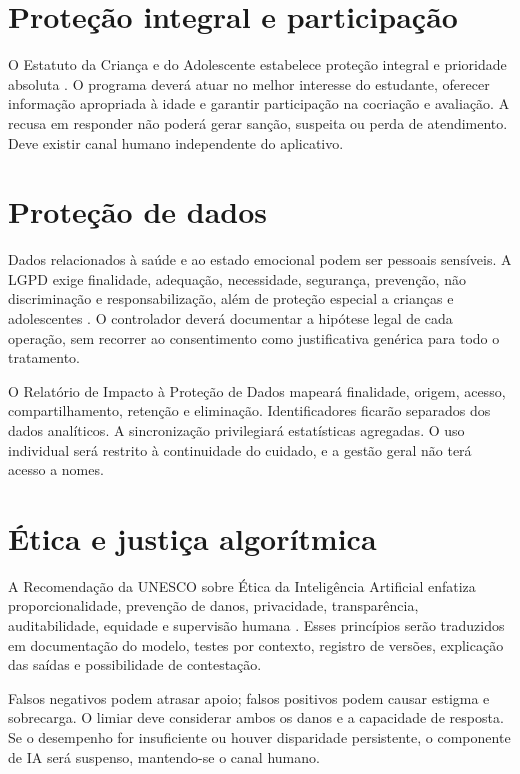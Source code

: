 \documentclass[
  12pt,
  openright,
  oneside,
  a4paper,
  english,
  brazil
]{abntex2}
\begin{document}
\section{Proteção integral e participação}

O Estatuto da Criança e do Adolescente estabelece proteção integral e prioridade
absoluta \cite{brasil8069}. O programa deverá atuar no melhor interesse do
estudante, oferecer informação apropriada à idade e garantir participação na
cocriação e avaliação. A recusa em responder não poderá gerar sanção, suspeita
ou perda de atendimento. Deve existir canal humano independente do aplicativo.

\section{Proteção de dados}

Dados relacionados à saúde e ao estado emocional podem ser pessoais sensíveis.
A LGPD exige finalidade, adequação, necessidade, segurança, prevenção, não
discriminação e responsabilização, além de proteção especial a crianças e
adolescentes \cite{brasil13709}. O controlador deverá documentar a hipótese
legal de cada operação, sem recorrer ao consentimento como justificativa
genérica para todo o tratamento.

O Relatório de Impacto à Proteção de Dados mapeará finalidade, origem, acesso,
compartilhamento, retenção e eliminação. Identificadores ficarão separados dos
dados analíticos. A sincronização privilegiará estatísticas agregadas. O uso
individual será restrito à continuidade do cuidado, e a gestão geral não terá
acesso a nomes.

\section{Ética e justiça algorítmica}

A Recomendação da UNESCO sobre Ética da Inteligência Artificial enfatiza
proporcionalidade, prevenção de danos, privacidade, transparência, auditabilidade,
equidade e supervisão humana \cite{unesco2022}. Esses princípios serão
traduzidos em documentação do modelo, testes por contexto, registro de versões,
explicação das saídas e possibilidade de contestação.

Falsos negativos podem atrasar apoio; falsos positivos podem causar estigma e
sobrecarga. O limiar deve considerar ambos os danos e a capacidade de resposta.
Se o desempenho for insuficiente ou houver disparidade persistente, o componente
de IA será suspenso, mantendo-se o canal humano.
\end{document}
